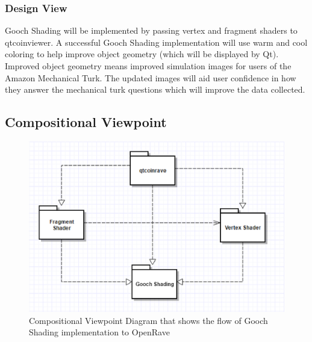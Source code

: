 \documentclass[10pt,journal,compsoc,draftclsnofoot]{IEEEtran}
\begin{document}
\begin{flushleft}
\subsubsection{Design View}
Gooch Shading will be implemented by passing vertex and fragment shaders to qtcoinviewer.
A successful Gooch Shading implementation will use warm and cool coloring to help improve object geometry (which will be displayed by Qt).
Improved object geometry means improved simulation images for users of the Amazon Mechanical Turk.
The updated images will aid user confidence in how they answer the mechanical turk questions which will improve the data collected.

\subsection{Compositional Viewpoint}

\begin{figure} [H]
  \includegraphics[scale=0.9]{Gooch_Shading2_composition.eps}
  \caption
{ \newline \hspace{\linewidth}
Compositional Viewpoint Diagram that shows the flow of Gooch Shading implementation to OpenRave}
  \label{fig:Gooch_Shading2_composition}
\end{figure}


\end{flushleft}
\end{document}
